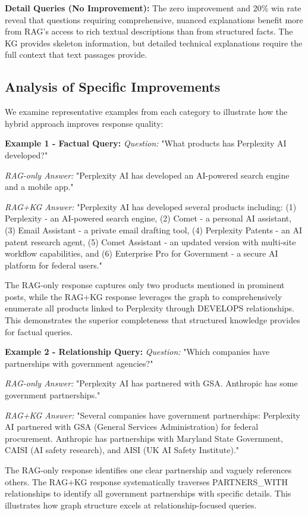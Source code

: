 \documentclass[11pt,twocolumn]{article}
\begin{document}
\textbf{Detail Queries (No Improvement):} The zero improvement and 20\% win rate reveal that questions requiring comprehensive, nuanced explanations benefit more from RAG's access to rich textual descriptions than from structured facts. The KG provides skeleton information, but detailed technical explanations require the full context that text passages provide.

\subsection{Analysis of Specific Improvements}

We examine representative examples from each category to illustrate how the hybrid approach improves response quality:

\textbf{Example 1 - Factual Query:}
\textit{Question:} "What products has Perplexity AI developed?"

\textit{RAG-only Answer:} "Perplexity AI has developed an AI-powered search engine and a mobile app."

\textit{RAG+KG Answer:} "Perplexity AI has developed several products including: (1) Perplexity - an AI-powered search engine, (2) Comet - a personal AI assistant, (3) Email Assistant - a private email drafting tool, (4) Perplexity Patents - an AI patent research agent, (5) Comet Assistant - an updated version with multi-site workflow capabilities, and (6) Enterprise Pro for Government - a secure AI platform for federal users."

The RAG-only response captures only two products mentioned in prominent posts, while the RAG+KG response leverages the graph to comprehensively enumerate all products linked to Perplexity through DEVELOPS relationships. This demonstrates the superior completeness that structured knowledge provides for factual queries.

\textbf{Example 2 - Relationship Query:}
\textit{Question:} "Which companies have partnerships with government agencies?"

\textit{RAG-only Answer:} "Perplexity AI has partnered with GSA. Anthropic has some government partnerships."

\textit{RAG+KG Answer:} "Several companies have government partnerships: Perplexity AI partnered with GSA (General Services Administration) for federal procurement. Anthropic has partnerships with Maryland State Government, CAISI (AI safety research), and AISI (UK AI Safety Institute)."

The RAG-only response identifies one clear partnership and vaguely references others. The RAG+KG response systematically traverses PARTNERS\_WITH relationships to identify all government partnerships with specific details. This illustrates how graph structure excels at relationship-focused queries.
\end{document}
